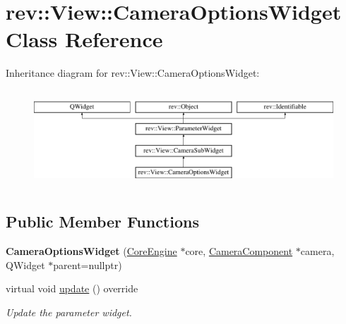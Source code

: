 \hypertarget{classrev_1_1_view_1_1_camera_options_widget}{}\section{rev\+::View\+::Camera\+Options\+Widget Class Reference}
\label{classrev_1_1_view_1_1_camera_options_widget}
Inheritance diagram for rev\+::View\+::Camera\+Options\+Widget\+:\begin{figure}[H]
\begin{center}
\leavevmode
\includegraphics[height=3.660131cm]{classrev_1_1_view_1_1_camera_options_widget}
\end{center}
\end{figure}
\subsection*{Public Member Functions}
\begin{DoxyCompactItemize}
\item 
\mbox{\label{classrev_1_1_view_1_1_camera_options_widget_a486a0d0f6b644991a9ac5edce74f49e4}} 
{\bfseries Camera\+Options\+Widget} (\mbox{\hyperlink{classrev_1_1_core_engine}{Core\+Engine}} $\ast$core, \mbox{\hyperlink{classrev_1_1_camera_component}{Camera\+Component}} $\ast$camera, Q\+Widget $\ast$parent=nullptr)
\item 
\mbox{\label{classrev_1_1_view_1_1_camera_options_widget_adc1b4524b5d8bd1720ad0ea5f38e3a17}} 
virtual void \mbox{\hyperlink{classrev_1_1_view_1_1_camera_options_widget_adc1b4524b5d8bd1720ad0ea5f38e3a17}{update}} () override
\begin{DoxyCompactList}\small\item\em Update the parameter widget. \end{DoxyCompactList}\end{DoxyCompactItemize}
